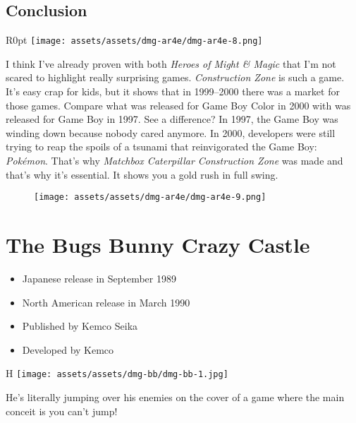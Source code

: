 \documentclass{book}
\begin{document}
\FloatBarrier\needspace{10mm}\section*{Conclusion}\nopagebreak[4]

\begin{wrapfigure}{R}{0pt} \texttt{[image: assets/assets/dmg-ar4e/dmg-ar4e-8.png]}\end{wrapfigure}
I think I’ve already proven with both \emph{Heroes of Might \& Magic} that I’m not scared to highlight really surprising games. \emph{Construction Zone} is such a game. It’s easy crap for kids, but it shows that in 1999–2000 there was a market for those games. Compare what was released for Game Boy Color in 2000 with was released for Game Boy in 1997. See a difference? In 1997, the Game Boy was winding down because nobody cared anymore. In 2000, developers were still trying to reap the spoils of a tsunami that reinvigorated the Game Boy: \emph{Pokémon}. That’s why \emph{Matchbox Caterpillar Construction Zone} was made and that’s why it’s essential. It shows you a gold rush in full swing.

\begin{figure}[hbt]
\vskip 10pt
\centering \texttt{[image: assets/assets/dmg-ar4e/dmg-ar4e-9.png]}
\vskip 6pt
\end{figure}


\begingroup \chapter*{The Bugs Bunny Crazy Castle} \endgroup

\begin{itemize} \setlength\itemsep{-0.4em}
\item Japanese release in September 1989
\item North American release in March 1990
\item Published by Kemco Seika
\item Developed by Kemco
\end{itemize}\noindent

\begin{wrapfigure}{H}{\linewidth}
\vskip 4pt
\centering \texttt{[image: assets/assets/dmg-bb/dmg-bb-1.jpg]}\par\pagetwodescription He’s literally jumping over his enemies on the cover of a game where the main conceit is you can’t jump!\end{wrapfigure}
\clearpage
\end{document}
